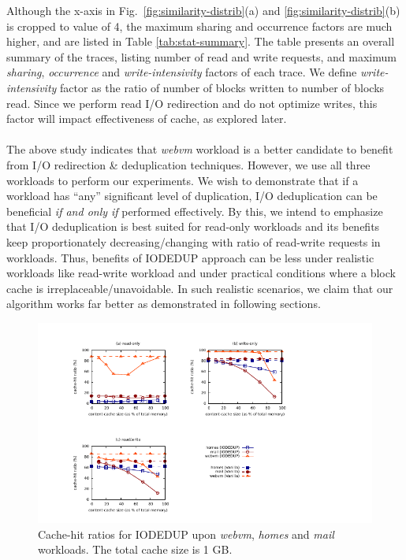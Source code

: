 Although the x-axis in
Fig.~\ref{fig:similarity-distrib}(a) and \ref{fig:similarity-distrib}(b)
is cropped to
value of 4, the maximum sharing and occurrence factors
are much higher, and are listed in Table \ref{tab:stat-summary}.
The table presents an overall summary of the traces,
listing number of read and write requests, and
maximum \textit{sharing}, \textit{occurrence} and
\textit{write-intensivity} factors of each trace.
We define \textit{write-intensivity}
factor as the ratio of number of blocks written to number of blocks read. Since
we perform read I/O redirection 
and do not optimize writes, this factor
will impact effectiveness of cache, as explored later.
\\
\\
The above study indicates that \textit{webvm} workload is a better candidate to
benefit from I/O redirection \& deduplication techniques. However,
we use all three workloads
to perform our experiments. We wish to demonstrate that if a workload has
``any'' significant level of duplication, I/O deduplication can be beneficial
\textit{if and only if} performed effectively. By this, we intend to emphasize
that I/O deduplication is best suited for read-only workloads and its benefits 
keep proportionately decreasing/changing with ratio of read-write requests 
in workloads. Thus, benefits of IODEDUP approach can be less under realistic 
workloads like read-write workload and under practical conditions where a 
block cache is irreplaceable/unavoidable. In such realistic scenarios, we 
claim that our algorithm works far better as demonstrated in following sections.

\begin{figure}
	\begin{minipage}{0.9\textwidth}
\vspace{-1in}
\hspace{-1.5in}
\includegraphics[scale=1.95]{drivechap-figures/sweetspot/sweetspot-multiplot-revised.pdf}
	\vspace{-0.5in}
	\caption{Cache-hit ratios for IODEDUP upon \textit{webvm}, \textit{homes} and \textit{mail} workloads. The total cache size is 1 GB.}
\label{fig:sweetspot}
	\end{minipage}
\end{figure}



